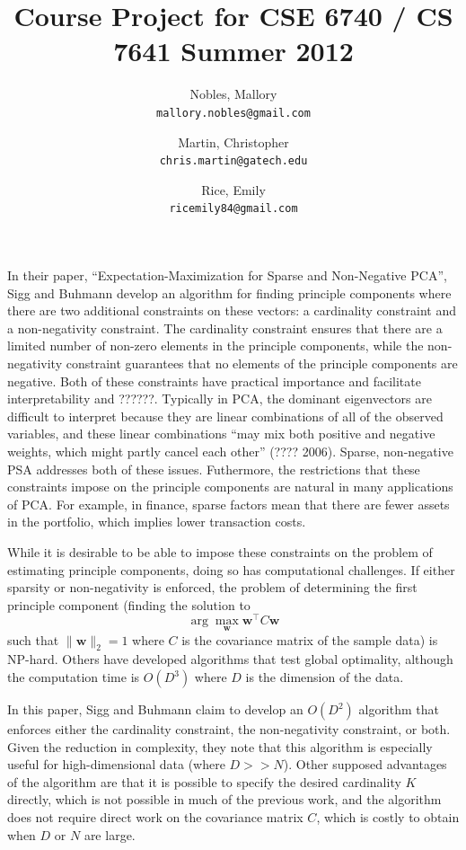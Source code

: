\documentclass[twocolumn]{article}
\title{Course Project for CSE 6740 / CS 7641 Summer 2012}
\author{Nobles, Mallory \\ \texttt{mallory.nobles@gmail.com}
  \and Martin, Christopher \\ \texttt{chris.martin@gatech.edu}
  \and Rice, Emily \\ \texttt{ricemily84@gmail.com} }
\date{}
\begin{document}
\maketitle

In their paper, ``Expectation-Maximization for Sparse and Non-Negative PCA'',
Sigg and Buhmann develop an algorithm for finding principle components where
there are two additional constraints on these vectors:
a cardinality constraint and a non-negativity constraint.
The cardinality constraint ensures that there are a limited number
of non-zero elements in the principle components, while
the non-negativity constraint guarantees that no elements of
the principle components are negative.
Both of these constraints have practical importance and facilitate
interpretability and ??????.
Typically in PCA, the dominant eigenvectors are difficult to interpret
because they are linear combinations of all of the observed variables,
and these linear combinations ``may mix both positive and negative weights,
which might partly cancel each other'' (???? 2006).
Sparse, non-negative PSA addresses both of these issues.
Futhermore, the restrictions that these constraints impose on the
principle components are natural in many applications of PCA.
For example, in finance, sparse factors mean that there are
fewer assets in the portfolio, which implies lower transaction costs.

While it is desirable to be able to impose these constraints on
the problem of estimating principle components, doing so has
computational challenges. If either sparsity or non-negativity
is enforced, the problem of determining the first principle component
(finding the solution to
\[ \arg\max_{\mathbf{w}} \mathbf{w}^\intercal C\mathbf{w} \]
such that $\|\mathbf{w}\|_2 = 1$
where $C$ is the covariance matrix of the sample data) is NP-hard.
Others have developed algorithms that test global optimality, although
the computation time is $O(D^3)$ where $D$ is the dimension of the data.

In this paper, Sigg and Buhmann claim to develop an $O(D^2)$ algorithm
that enforces either the cardinality constraint,
the non-negativity constraint, or both.
Given the reduction in complexity, they note that this algorithm is
especially useful for high-dimensional data (where $D >> N$).
Other supposed advantages of the algorithm are that it is possible
to specify the desired cardinality $K$ directly, which is not possible
in much of the previous work, and the algorithm does not require
direct work on the covariance matrix $C$, which is costly to obtain
when $D$ or $N$ are large.
\end{document}
